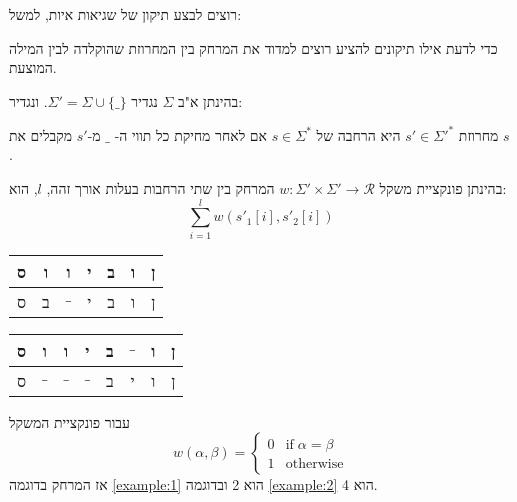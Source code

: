 רוצים לבצע תיקון של שגיאות איות, למשל:
\begin{center}
\end{center}

כדי לדעת אילו תיקונים להציע רוצים למדוד את המרחק בין המחרוזת שהוקלדה לבין המילה המוצעת.

בהינתן א"ב 
$\Sigma$
נגדיר
$\Sigma' = \Sigma \cup \{\_\}$.
ונגדיר:
\begin{definition}[הרחבה]
מחרוזת
$s' \in \Sigma'^*$
היא הרחבה של
$s \in \Sigma^*$ 
אם לאחר מחיקת כל תווי ה-%
$\_$
מ-$s'$ מקבלים את $s$.
\end{definition}

בהינתן פונקציית משקל 
$w: \Sigma' \times \Sigma' \to \mathcal{R}$
המרחק בין שתי הרחבות בעלות אורך זהה, $l$, הוא:
$$\sum_{i = 1}^l w(s'_1[i], s'_2[i])$$

\begin{example}
\label{example:1}
\begin{tabular}{|c|c|c|c|c|c|c|}
\hline
ס & ו & ו & י & ב & ו & ן
\\\hline
ס & ב & $\_$ & י & ב & ו & ן
\\\hline
\end{tabular}
\end{example}

\begin{example}
\label{example:2}
\begin{tabular}{|c|c|c|c|c|c|c|c|}
\hline
ס 
& ו
& ו 
& י 
& ב
& $\_$  
& ו 
& ן
\\\hline
ס 
& $\_$ 
& $\_$ 
& $\_$ 
& ב 
& י 
& ו 
& ן
\\\hline
\end{tabular}
\end{example}

עבור פונקציית המשקל
$$
w(\alpha, \beta) = 
\begin{cases}
0	& \text{if}\; \alpha = \beta
\\
1	& \text{otherwise}
\end{cases}
$$
אז המרחק בדוגמה 
\ref{example:1}
הוא 2 ובדוגמה
\ref{example:2}
הוא 4.

